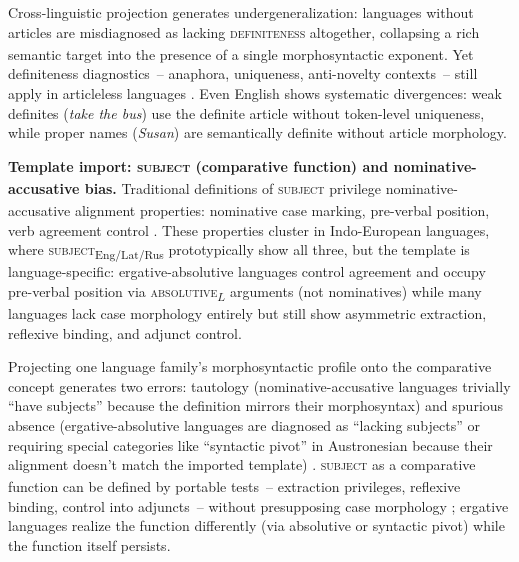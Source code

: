\documentclass[12pt]{article}
\begin{document}
\begin{exe}
Cross-linguistic projection generates undergeneralization: languages without articles are misdiagnosed as lacking \textsc{definiteness}\textsubscript{\Cross} altogether, collapsing a rich semantic target into the presence of a single morphosyntactic exponent. Yet definiteness diagnostics~-- anaphora, uniqueness, anti-novelty contexts~-- still apply in articleless languages \parencite{Lyons1999,Matthewson2004}. Even English shows systematic divergences: weak definites (\textit{take the bus}) use the definite article without token-level uniqueness, while proper names (\textit{Susan}) are semantically definite without article morphology.

\ex\label{ex:subject-template}
\textbf{Template import: \textsc{subject}\textsubscript{\Cross} (comparative function) and nominative-accusative bias.}
Traditional definitions of \textsc{subject}\textsubscript{\Cross} privilege nominative-accusative alignment properties: nominative case marking, pre-verbal position, verb agreement control \parencite{Keenan1976,Comrie2013AlignmentCaseNPs}. These properties cluster in Indo-European languages, where \textsc{subject}\textsubscript{Eng/Lat/Rus} prototypically show all three, but the template is language-specific: ergative-absolutive languages control agreement and occupy pre-verbal position via \textsc{absolutive}\textsubscript{$L$} arguments (not nominatives) while many languages lack case morphology entirely but still show asymmetric extraction, reflexive binding, and adjunct control.

Projecting one language family's morphosyntactic profile onto the comparative concept generates two errors: tautology (nominative-accusative languages trivially \enquote{have subjects} because the definition mirrors their morphosyntax) and spurious absence (ergative-absolutive languages are diagnosed as \enquote{lacking subjects} or requiring special categories like \enquote{syntactic pivot} in Austronesian because their alignment doesn't match the imported template) \parencite{DixonAikhenvald1997}. \textsc{subject}\textsubscript{\Cross} as a comparative function can be defined by portable tests~-- extraction privileges, reflexive binding, control into adjuncts~-- without presupposing case morphology \parencite{ManningEtAl1999}; ergative languages realize the function differently (via absolutive or syntactic pivot) while the function itself persists.


\end{exe}
\end{document}
